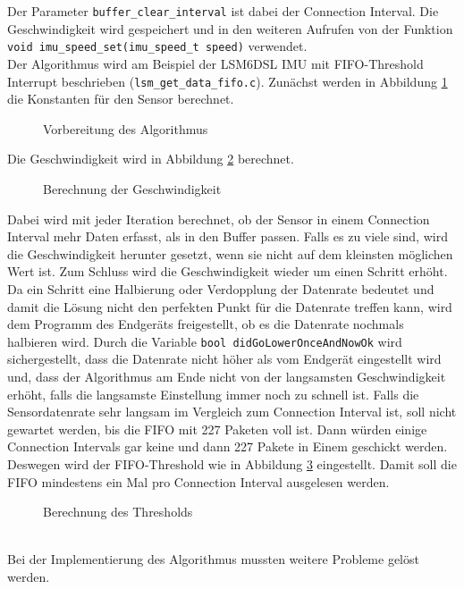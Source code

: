 Der Parameter \texttt{buffer\_clear\_interval} ist dabei der Connection Interval.
Die Geschwindigkeit wird gespeichert und in den weiteren Aufrufen von der Funktion \texttt{void imu\_speed\_set(\allowbreak{}imu\_speed\_t speed)} verwendet.\\
Der Algorithmus wird am Beispiel der LSM6DSL IMU mit FIFO-Threshold Interrupt beschrieben (\texttt{lsm\_get\_data\_fifo.c}).
Zunächst werden in Abbildung \ref{lst:algoPre} die Konstanten für den Sensor berechnet.
\begin{figure}[hbtp]
	
	\caption{Vorbereitung des Algorithmus}
	\label{lst:algoPre}
\end{figure}
Die Geschwindigkeit wird in Abbildung \ref{lst:algo} berechnet.
\begin{figure}[hbtp]
	
	\caption{Berechnung der Geschwindigkeit}
	\label{lst:algo}
\end{figure}
Dabei wird mit jeder Iteration berechnet, ob der Sensor in einem Connection Interval mehr Daten erfasst, als in den Buffer passen.
Falls es zu viele sind, wird die Geschwindigkeit herunter gesetzt, wenn sie nicht auf dem kleinsten möglichen Wert ist.
Zum Schluss wird die Geschwindigkeit wieder um einen Schritt erhöht.
Da ein Schritt eine Halbierung oder Verdopplung der Datenrate bedeutet und damit die Lösung nicht den perfekten Punkt für die Datenrate treffen kann, wird dem Programm des Endgeräts freigestellt, ob es die Datenrate nochmals halbieren wird.
Durch die Variable \texttt{bool didGoLowerOnceAndNowOk} wird sichergestellt, dass die Datenrate nicht höher als vom Endgerät eingestellt wird und, dass der Algorithmus am Ende nicht von der langsamsten Geschwindigkeit erhöht, falls die langsamste Einstellung immer noch zu schnell ist.
Falls die Sensordatenrate sehr langsam im Vergleich zum Connection Interval ist, soll nicht gewartet werden, bis die FIFO mit 227 Paketen voll ist.
Dann würden einige Connection Intervals gar keine und dann 227 Pakete in Einem geschickt werden.
Deswegen wird der FIFO-Threshold wie in Abbildung \ref{lst:algoPost} eingestellt.
Damit soll die FIFO mindestens ein Mal pro Connection Interval ausgelesen werden.
\begin{figure}[hbtp]
	
	\caption{Berechnung des Thresholds}
	\label{lst:algoPost}
\end{figure}\\
Bei der Implementierung des Algorithmus mussten weitere Probleme gelöst werden.\\\\
